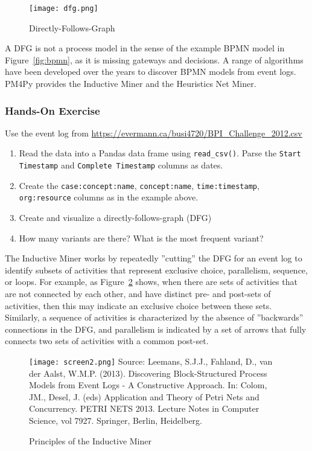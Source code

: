 \begin{figure}
\centering
\texttt{[image: dfg.png]}
\caption{Directly-Follows-Graph}
\label{fig:dfg}
\end{figure}

A DFG is not a process model in the sense of the example BPMN model in Figure~\ref{fig:bpmn}, as it is missing gateways and decisions. A range of algorithms have been developed over the years to discover BPMN models from event logs. PM4Py provides the Inductive Miner and the Heuristics Net Miner. 

\begin{tcolorbox}[colback=code]
\subsubsection*{Hands-On Exercise}
Use the event log from \url{https://evermann.ca/busi4720/BPI_Challenge_2012.csv}
\begin{enumerate}
   \item Read the data into a Pandas data frame using \texttt{read\_csv()}. Parse the \texttt{Start Timestamp} and \texttt{Complete Timestamp} columns as dates.
   \item Create the \texttt{case:concept:name}, \texttt{concept:name}, \texttt{time:timestamp}, \texttt{org:resource} columns as in the example above.
   \item Create and visualize a directly-follows-graph (DFG)
   \item How many variants are there? What is the most frequent variant?
\end{enumerate}
\end{tcolorbox}

The Inductive Miner works by repeatedly ''cutting'' the DFG for an event log to identify subsets of activities that represent exclusive choice, parallelism, sequence, or loops. For example, as Figure~\ref{fig:inductive} shows, when there are sets of activities that are not connected by each other, and have distinct pre- and post-sets of activities, then this may indicate an exclusive choice between these sets. Similarly, a sequence of activities is characterized by the absence of ''backwards'' connections in the DFG, and parallelism is indicated by a set of arrows that fully connects two sets of activities with a common post-set. 

\begin{figure}
\texttt{[image: screen2.png]}
\scriptsize 
Source: Leemans, S.J.J., Fahland, D., van der Aalst, W.M.P. (2013). Discovering Block-Structured Process Models from Event Logs - A Constructive Approach. In: Colom, JM., Desel, J. (eds) Application and Theory of Petri Nets and Concurrency. PETRI NETS 2013. Lecture Notes in Computer Science, vol 7927. Springer, Berlin, Heidelberg.
\caption{Principles of the Inductive Miner}
\label{fig:inductive}
\end{figure}

